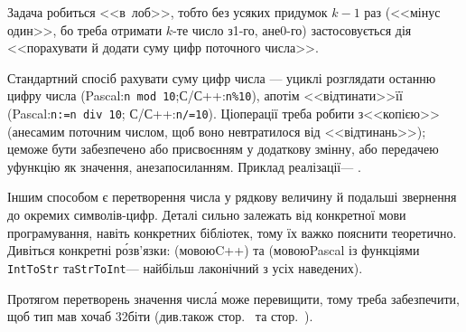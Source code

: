 \Tutorial	Задача робиться <<в~лоб>>, тобто без усяких придумок $k{-}1$ раз (<<мінус один>>, бо треба отримати \mbox{$k$-те} число з\nolinebreak[3] \mbox{1-го}, а\nolinebreak[3] не\nolinebreak[3] \mbox{0-го}) застосовується дія <<порахувати й додати суму цифр поточного числа>>. 

\label{text:sum-of-digits}
Стандартний спосіб рахувати суму цифр числа --- у\nolinebreak[3] циклі розглядати останню цифру числа (Pascal:\nolinebreak[2] \mbox{\texttt{n~mod~10}};\linebreak[1] С/С++:\nolinebreak[2] \mbox{\texttt{n\%10}}), а\nolinebreak[3] потім <<відтинати>>\nolinebreak[2] її (Pascal:\nolinebreak[2] \mbox{\texttt{n:=n~div~10}}; С/С++:\nolinebreak[2] \mbox{\texttt{n/=10}}). Ці\nolinebreak[2] операції треба робити з\nolinebreak[3] <<копією>> (а\nolinebreak[3] не\nolinebreak[3] самим поточним числом, щоб воно не\nolinebreak[3] втратилося від <<відтинань>>); це\nolinebreak[1] може бути забезпечено або присвоєнням у додаткову змінну, або передачею у\nolinebreak[3] функцію як значення, а\nolinebreak[3] не\nolinebreak[3] за\nolinebreak[2] посиланням.
Приклад реалізації\nolinebreak[3] --- .

Іншим способом є перетворення числа у рядкову величину й подальші звернення до окремих символів-цифр. Деталі сильно залежать від конкретної мови програмування, навіть конкретних бібліотек, тому їх важко пояснити теоре\-тично. Дивіться конкретні р\'{о}зв'язки:  (мовою\nolinebreak[2] C++) та  (мовою\nolinebreak[1] Pascal із функціями \texttt{IntToStr} та\nolinebreak[2] \texttt{StrToInt}\nolinebreak[3] --- найбільш лаконічний з усіх наведених).

Протягом перетворень значення числ\'{а} може перевищити, тому треба забезпечити, щоб тип мав хоча\nolinebreak[3] б 32\nolinebreak[3] біти (див.\nolinebreak[2] також стор.~\pageref{text:overflow-example} та стор.~\pageref{text:notes-about-delphi-mode}).

